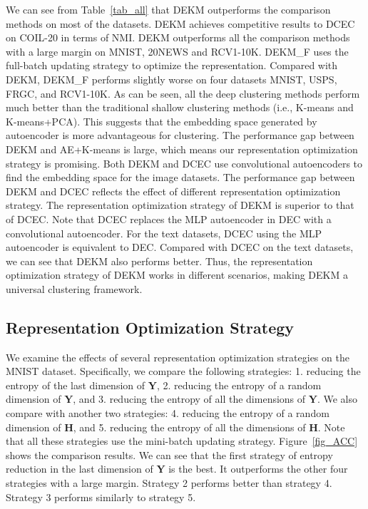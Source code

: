 We can see from Table~\ref{tab_all} that DEKM outperforms the comparison methods on most of the datasets. DEKM achieves competitive results to DCEC on COIL-20 in terms of NMI. DEKM outperforms all the comparison methods with a large margin on MNIST, 20NEWS and RCV1-10K. DEKM\_F uses the full-batch updating strategy to optimize the representation. Compared with DEKM, DEKM\_F performs slightly worse on four datasets MNIST, USPS, FRGC, and RCV1-10K. As can be seen, all the deep clustering methods perform much better than the traditional shallow clustering methods (i.e., K-means and K-means+PCA). This suggests that the embedding space generated by autoencoder is more advantageous for clustering. The performance gap between DEKM and AE+K-means is large, which means our representation optimization strategy is promising. Both DEKM and DCEC use convolutional autoencoders to find the embedding space for the image datasets. The performance gap between DEKM and DCEC reflects the effect of different representation optimization strategy. The representation optimization strategy of DEKM is superior to that of DCEC. Note that DCEC replaces the MLP autoencoder in DEC with a convolutional autoencoder. For the text datasets, DCEC using the MLP autoencoder is equivalent to DEC. Compared with DCEC on the text datasets, we can see that DEKM also performs better. Thus, the representation optimization strategy of DEKM works in different scenarios, making DEKM a universal clustering framework.

\subsection{Representation Optimization Strategy }

We examine the effects of several representation optimization strategies on the MNIST dataset. Specifically, we compare the following strategies: 1. reducing the entropy of the last dimension of $\mathbf{Y}$, 2. reducing the entropy of a random dimension of $\mathbf{Y}$, and 3. reducing the entropy of all the dimensions of $\mathbf{Y}$. We also compare with another two strategies: 4. reducing the entropy of a random dimension of $\mathbf{H}$, and 5. reducing the entropy of all the dimensions of $\mathbf{H}$. Note that all these strategies use the mini-batch updating strategy. Figure~\ref{fig_ACC} shows the comparison results. We can see that the first strategy of entropy reduction in the last dimension of $\mathbf{Y}$ is the best. It outperforms the other four strategies with a large margin. Strategy 2 performs better than strategy 4. Strategy 3 performs similarly to strategy 5.

